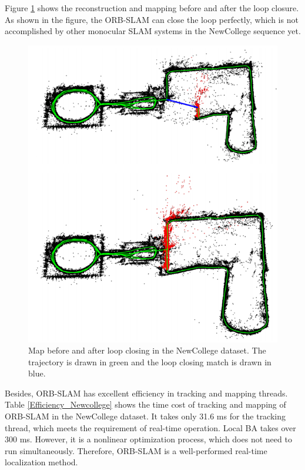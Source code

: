 \documentclass[letterpaper, 10 pt, conference]{ieeeconf}  %
\begin{document}
Figure \ref{new_college} shows the reconstruction and mapping before and after the loop closure. As shown in the figure, the ORB-SLAM can close the loop perfectly, which is not accomplished by other monocular SLAM systems in the NewCollege sequence yet.

%
\begin{figure}[!htbp]%
\centering
\includegraphics[scale=0.37]{./images/NewCollege}
\caption{Map before and after loop closing in the NewCollege dataset. The trajectory is drawn in green and the loop closing match is drawn in blue. \cite{ORBSLAM}}
\label{new_college}
\end{figure}
%
Besides, ORB-SLAM has excellent efficiency in tracking and mapping threads. Table \ref{Efficiency_Newcollege} shows the time cost of tracking and mapping of ORB-SLAM in the NewCollege dataset. It takes only 31.6 ms for the tracking thread, which meets the requirement of real-time operation. Local BA takes over 300 ms. However, it is a nonlinear optimization process, which does not need to run simultaneously. Therefore, ORB-SLAM is a well-performed real-time localization method.
%
\end{document}
